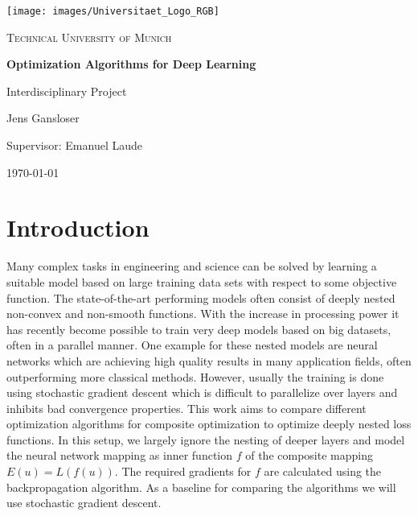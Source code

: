\documentclass[english,11pt,a4paper]{article}
\begin{document}
\begin{titlepage}
	\centering
	
	\texttt{[image: images/Universitaet\_Logo\_RGB]}\par
	\vspace{0.5cm}
	
	{\scshape \large Technical University of Munich \par}
	\vspace{0.5cm}
	
	{\bfseries \Large Optimization Algorithms for Deep Learning \par}
	{Interdisciplinary Project \par}
	\vspace{0.5cm}
	
	{Jens Gansloser \par}
	{Supervisor: Emanuel Laude \par}
	\vspace{0.5cm}
	
	{\today \par}
	\vspace{0.5cm}
\end{titlepage}

\section{Introduction}

Many complex tasks in engineering and science can be solved by learning a suitable model based on large training data sets with respect to some objective function. The state-of-the-art performing models often consist of deeply nested non-convex and non-smooth functions. With the increase in processing power it has recently become possible to train very deep models based on big datasets, often in a parallel manner. One example for these nested models are neural networks which are achieving high quality results in many application fields, often outperforming more classical methods. However, usually the training is done using stochastic gradient descent which is difficult to parallelize over layers and inhibits bad convergence properties. This work aims to compare different optimization algorithms for composite optimization to optimize deeply nested loss functions. In this setup, we largely ignore the nesting of deeper layers and model the neural network mapping as inner function $f$ of the composite mapping $E(u) = L(f(u))$. The required gradients for $f$ are calculated using the backpropagation algorithm. As a baseline for comparing the algorithms we will use stochastic gradient descent.
\end{document}
